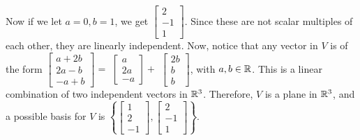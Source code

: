    Now if we let $a=0,b=1$, we get
        $\begin{bmatrix}
            2 \\
            -1 \\
            1
        \end{bmatrix}$.
    Since these are not scalar multiples of each other, they are linearly independent. Now, notice that any vector in $V$ is of the form
    $\begin{bmatrix}
        a+2b \\
        2a-b \\
        -a+b
    \end{bmatrix} =$
    $\begin{bmatrix}
        a \\
        2a \\
        -a
    \end{bmatrix} + $
    $\begin{bmatrix}
        2b \\
        b \\
        b
    \end{bmatrix}$,
    with $a,b \in \mathbb{R}$. This is a linear combination of two independent vectors in $\mathbb{R}^3$. Therefore, $V$ is a plane in $\mathbb{R}^3$, and a possible basis for $V$ is
    $\left\{ \begin{bmatrix}
            1 \\
            2 \\
            -1
            \end{bmatrix},
            \begin{bmatrix}
                2 \\
                -1 \\
                1
            \end{bmatrix} \right\}$.